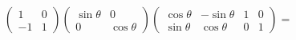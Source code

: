 ﻿\documentclass{book} \usepackage{exsheets} \usepackage{xeCJK}
\begin{document}
\begin{solution}
\begin{align*}
\begin{pmatrix}
                                                                                                                                                                                                             1&0\\
                                                                                                                                                                                                             -1&1
                                                                                                                                                                                                           \end{pmatrix}
                                                                                                                                                                                                                 \begin{pmatrix}
                                                                                                                                                                                                                   \sin\theta&0\\
                                                                                                                                                                                                                   0&\cos\theta
                                                                                                                                                                                                                 \end{pmatrix}
                                                                                                                                                                                                                      \begin{pmatrix}
                                                                                                                                                                                                                        \cos\theta&-\sin\theta&1&0\\
                                                                                                                                                                                                                        \sin\theta&\cos\theta&0&1
                                                                                                                                                                                                                      \end{pmatrix}=

\end{align*}
\end{solution}
\end{document}
